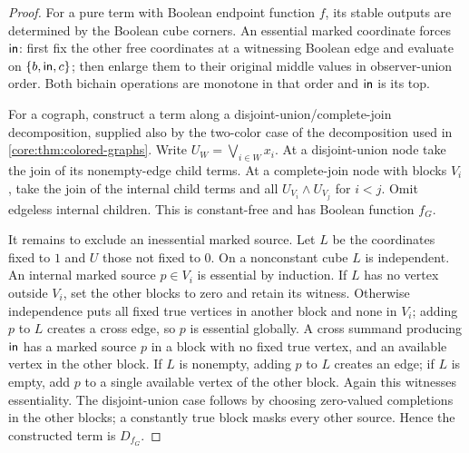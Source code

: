 \begin{proof}
For a pure term with Boolean endpoint function $f$, its stable outputs
are determined by the Boolean cube corners. An essential marked coordinate
forces $\mathsf{in}$: first fix the other free coordinates at a witnessing
Boolean edge and evaluate on $\{b,\mathsf{in},c\}$; then enlarge them to
their original middle values in observer-union order. Both bichain
operations are monotone in that order and $\mathsf{in}$ is its top.

For a cograph, construct a term along a disjoint-union/complete-join
decomposition, supplied also by the two-color case of the decomposition
used in \cref{core:thm:colored-graphs}. Write $U_W=\bigvee_{i\in W}x_i$.
At a disjoint-union node take the join of its nonempty-edge child terms.
At a complete-join node with blocks $V_i$, take the join of the internal
child terms and all $U_{V_i}\wedge U_{V_j}$ for $i<j$. Omit edgeless
internal children. This is constant-free and has Boolean function $f_G$.

It remains to exclude an inessential marked source. Let $L$ be the
coordinates fixed to $1$ and $U$ those not fixed to $0$. On a nonconstant
cube $L$ is independent. An internal marked source $p\in V_i$ is essential
by induction. If $L$ has no vertex outside $V_i$, set the other blocks to
zero and retain its witness. Otherwise independence puts all fixed true
vertices in another block and none in $V_i$; adding $p$ to $L$ creates a
cross edge, so $p$ is essential globally. A cross summand producing
$\mathsf{in}$ has a marked source $p$ in a block with no fixed true vertex,
and an available vertex in the other block. If $L$ is nonempty, adding
$p$ to $L$ creates an edge; if $L$ is empty, add $p$ to a single available
vertex of the other block. Again this witnesses essentiality. The
disjoint-union case follows by choosing zero-valued completions in the other blocks;
a constantly true block masks every other source. Hence the constructed
term is $D_{f_G}$.


\end{proof}
